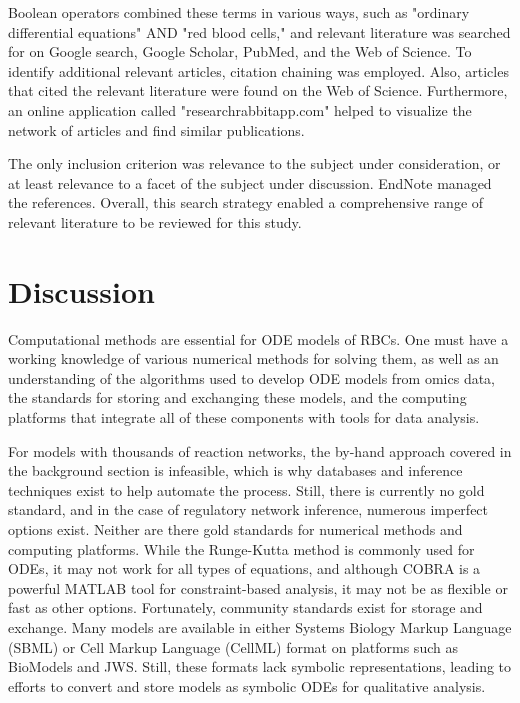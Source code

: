 \documentclass[conference]{IEEEtran}
\begin{document}
Boolean operators combined these terms in various ways, such as "ordinary differential equations" AND "red blood cells," and relevant literature was searched for on Google search, Google Scholar, PubMed, and the Web of Science. To identify additional relevant articles, citation chaining was employed. Also, articles that cited the relevant literature were found on the Web of Science. Furthermore, an online application called "researchrabbitapp.com" helped to visualize the network of articles and find similar publications.

The only inclusion criterion was relevance to the subject under consideration, or at least relevance to a facet of the subject under discussion. EndNote managed the references. Overall, this search strategy enabled a comprehensive range of relevant literature to be reviewed for this study.

\section{Discussion}
 Computational methods are essential for ODE models of RBCs. One must have a working knowledge of various numerical methods for solving them, as well as an understanding of the algorithms used to develop ODE models from omics data, the standards for storing and exchanging these models, and the computing platforms that integrate all of these components with tools for data analysis. 
 
 For models with thousands of reaction networks, the by-hand approach covered in the background section is infeasible, which is why databases and inference techniques exist to help automate the process. Still, there is currently no gold standard, and in the case of regulatory network inference, numerous imperfect options exist\cite{b49, b50, b51, b52, b53}. Neither are there gold standards for numerical methods and computing platforms. While the Runge-Kutta method is commonly used for ODEs, it may not work for all types of equations, and although COBRA is a powerful MATLAB tool for constraint-based analysis, it may not be as flexible or fast as other options\cite{b5, b8, b54}. Fortunately, community standards exist for storage and exchange. Many models are available in either Systems Biology Markup Language (SBML) or Cell Markup Language (CellML) format on platforms such as BioModels and JWS\cite{b5, b55, b56, b57}. Still, these formats lack symbolic representations, leading to efforts to convert and store models as symbolic ODEs for qualitative analysis\cite{b58}. 
\end{document}
